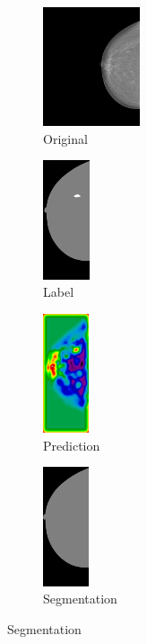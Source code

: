 \documentclass{beamer}
\begin{document}
\begin{frame}
\begin{figure}[h]
\begin{subfigure}{0.25\textwidth}
				\centering
					\includegraphics[height = 3.5cm]{plots/mammogram_ex2.png}
				\caption{Original}
			\end{subfigure}
			\begin{subfigure}{0.16\textwidth}
				\centering
					\includegraphics[height = 3.5cm]{plots/label_ex2.png}
				\caption{Label}
			\end{subfigure}
			\begin{subfigure}{0.17\textwidth}
				\centering
					\includegraphics[height = 3.5cm]{plots/logits_ex2_v3.png}
				\caption{Prediction}
			\end{subfigure}
			\begin{subfigure}{0.22\textwidth}
				\centering
					\includegraphics[height = 3.5cm]{plots/segmentation_ex2_v3.png}
				\caption{Segmentation}
			\end{subfigure}%
		\end{figure}		
	\end{frame}
	
\end{document}
